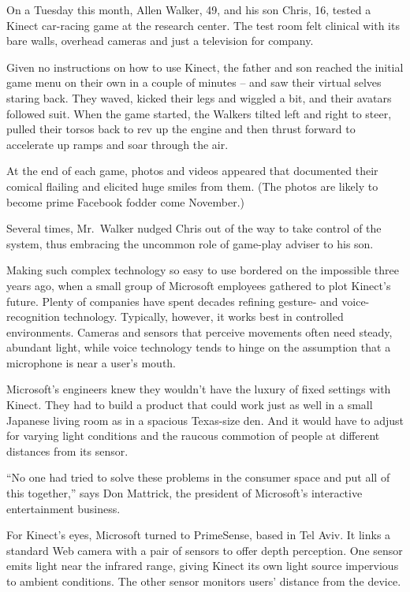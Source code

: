﻿\documentclass[12pt]{article}
\begin{document}
On a Tuesday this month, Allen Walker, 49, and his son Chris, 16, tested a Kinect car-racing game at
the research center. The test room felt clinical with its bare walls, overhead cameras and just a
television for company.

Given no instructions on how to use Kinect, the father and son reached the initial game menu on
their own in a couple of minutes -- and saw their virtual selves staring back. They waved, kicked
their legs and wiggled a bit, and their avatars followed suit. When the game started, the Walkers
tilted left and right to steer, pulled their torsos back to rev up the engine and then thrust
forward to accelerate up ramps and soar through the air.

At the end of each game, photos and videos appeared that documented their comical flailing and
elicited huge smiles from them. (The photos are likely to become prime Facebook fodder come
November.)

Several times, Mr.~Walker nudged Chris out of the way to take control of the system, thus embracing
the uncommon role of game-play adviser to his son.

Making such complex technology so easy to use bordered on the impossible three years ago, when a
small group of Microsoft employees gathered to plot Kinect's future. Plenty of companies have spent
decades refining gesture- and voice-recognition technology. Typically, however, it works best in
controlled environments. Cameras and sensors that perceive movements often need steady, abundant
light, while voice technology tends to hinge on the assumption that a microphone is near a user's
mouth.

Microsoft's engineers knew they wouldn't have the luxury of fixed settings with Kinect. They had to
build a product that could work just as well in a small Japanese living room as in a spacious
Texas-size den. And it would have to adjust for varying light conditions and the raucous commotion
of people at different distances from its sensor.

``No one had tried to solve these problems in the consumer space and put all of this together,''
says Don Mattrick, the president of Microsoft's interactive entertainment business.

For Kinect's eyes, Microsoft turned to PrimeSense, based in Tel Aviv. It links a standard Web camera
with a pair of sensors to offer depth perception. One sensor emits light near the infrared range,
giving Kinect its own light source impervious to ambient conditions. The other sensor monitors
users' distance from the device.
\end{document}
